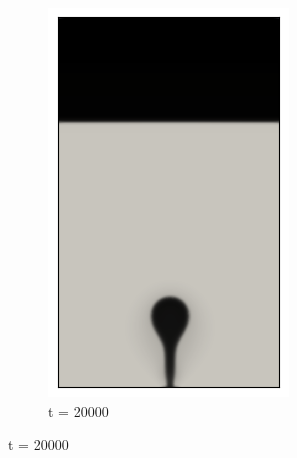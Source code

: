 \begin{figure}[H]
\begin{subfigure}{0.25\textwidth}
		\includegraphics[width=\linewidth]{figs/cap4/bb_760_s20}
		\caption{t = 20000}
		\label{fig:3}
	\end{subfigure}
	

\end{figure}
